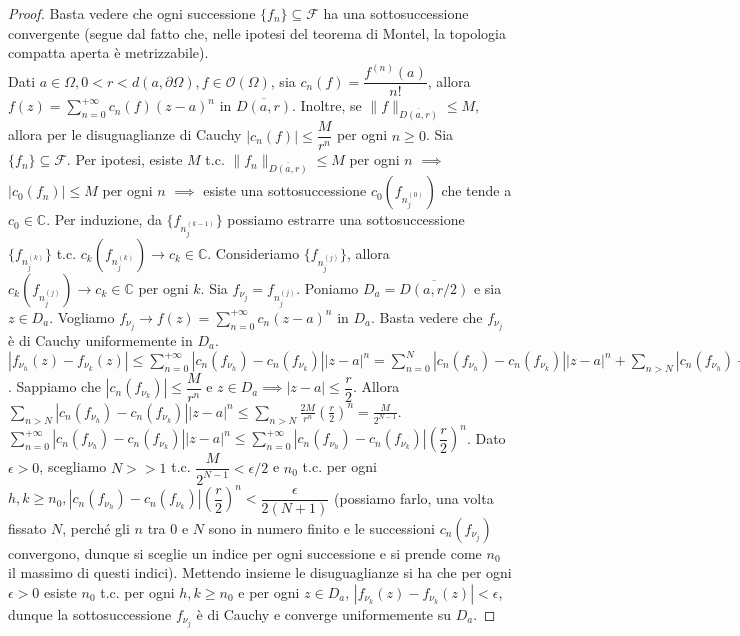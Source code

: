 \begin{proof}
  Basta vedere che ogni successione $\{f_n\} \subseteq \mathcal{F}$ ha una sottosuccessione convergente (segue dal fatto che, nelle ipotesi del teorema di Montel, la topologia compatta aperta è metrizzabile). \\
  Dati $a \in \Omega, 0<r<d(a, \partial \Omega), f \in \mathcal{O}(\Omega)$, sia $c_n(f)=\dfrac{f^{(n)}(a)}{n!}$, allora $\displaystyle f(z)=\sum_{n=0}^{+\infty} c_n(f)(z-a)^n$ in $\overline{D(a, r)}$.
  Inoltre, se $\|f\|_{\overline{D(a, r)}} \le M$, allora per le disuguaglianze di Cauchy $|c_n(f)| \le \dfrac{M}{r^n}$ per ogni $n \ge 0$.
  Sia $\{f_n\} \subseteq \mathcal{F}$. Per ipotesi, esiste $M$ t.c. $\|f_n\|_{\overline{D(a, r)}} \le M$ per ogni $n$ $\implies$ $|c_0(f_n)| \le M$ per ogni $n$ $\implies$ esiste una sottosuccessione $c_0(f_{n_j^{(0)}})$ che tende a $c_0 \in \mathbb{C}$.
  Per  induzione, da $\{f_{n_j^{(k-1)}}\}$ possiamo estrarre una sottosuccessione $\{f_{n_j^{(k)}}\}$ t.c. $c_k(f_{n_j^{(k)}}) \longrightarrow c_k \in \mathbb{C}$. Consideriamo $\{f_{n_j^{(j)}}\}$, allora $c_k(f_{n_j^{(j)}}) \longrightarrow c_k \in \mathbb{C}$ per ogni $k$.
  Sia $f_{\nu_j}=f_{n_j^{(j)}}$. Poniamo $D_a=\overline{D(a, r/2)}$ e sia $z \in D_a$. Vogliamo $\displaystyle f_{\nu_j} \longrightarrow f(z)=\sum_{n=0}^{+\infty} c_n(z-a)^n$ in $D_a$. Basta vedere che $f_{\nu_j}$ è di Cauchy uniformemente in $D_a$.
  $\displaystyle |f_{\nu_h}(z)-f_{\nu_k}(z)| \le \sum_{n=0}^{+\infty} |c_n(f_{\nu_h})-c_n(f_{\nu_k})||z-a|^n=\sum_{n=0}^N |c_n(f_{\nu_h})-c_n(f_{\nu_k})||z-a|^n+\sum_{n>N} |c_n(f_{\nu_h})-c_n(f_{\nu_k})||z-a|^n$.
  Sappiamo che $|c_n(f_{\nu_k})| \le \dfrac{M}{r^n}$ e $z \in D_a \implies |z-a| \le \dfrac{r}{2}$.
  Allora $\displaystyle \sum_{n>N} |c_n(f_{\nu_h})-c_n(f_{\nu_k})||z-a|^n \le \sum_{n>N} \frac{2M}{r^n}\left(\frac{r}{2}\right)^n=\frac{M}{2^{N-1}}$.
  $\displaystyle \sum_{n=0}^{+\infty} |c_n(f_{\nu_h})-c_n(f_{\nu_k})||z-a|^n \le \sum_{n=0}^{+\infty} |c_n(f_{\nu_h})-c_n(f_{\nu_k})|\left(\dfrac{r}{2}\right)^n$.
  Dato $\epsilon>0$, scegliamo $N>>1$ t.c. $\dfrac{M}{2^{N-1}}<\epsilon/2$ e $n_0$ t.c. per ogni $h, k \ge n_0, |c_n(f_{\nu_h})-c_n(f_{\nu_k})|\left(\dfrac{r}{2}\right)^n<\dfrac{\epsilon}{2(N+1)}$
  (possiamo farlo, una volta fissato $N$, perché gli $n$ tra $0$ e $N$ sono in numero finito e le successioni $c_n(f_{\nu_j})$ convergono, dunque si sceglie un indice per ogni successione e si prende come $n_0$ il massimo di questi indici).
  Mettendo insieme le disuguaglianze si ha che per ogni $\epsilon>0$ esiste $n_0$ t.c. per ogni $h, k \ge n_0$ e per ogni $z \in D_a$, $|f_{\nu_k}(z)-f_{\nu_k}(z)|<\epsilon$, dunque la sottosuccessione $f_{\nu_j}$ è di Cauchy e converge uniformemente su $D_a$.

\end{proof}
